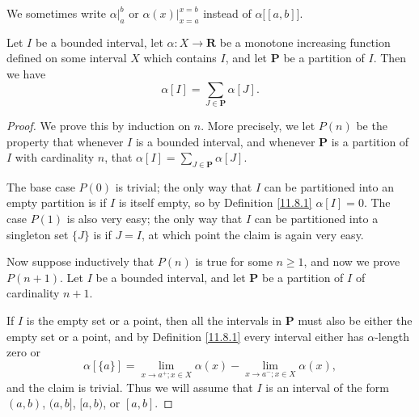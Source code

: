 \begin{note}
    We sometimes write \(\alpha\big|_a^b\) or \(\alpha(x)\big|_{x = a}^{x = b}\) instead of \(\alpha\big[[a, b]\big]\).
\end{note}

\setcounter{theorem}{3}
\begin{lemma}\label{11.8.4}
    Let \(I\) be a bounded interval, let \(\alpha : X \to \mathbf{R}\) be a monotone increasing function defined on some interval \(X\) which contains \(I\), and let \(\mathbf{P}\) be a partition of \(I\).
    Then we have
    \[
        \alpha[I] = \sum_{J \in \mathbf{P}} \alpha[J].
    \]
\end{lemma}

\begin{proof}
    We prove this by induction on \(n\).
    More precisely, we let \(P(n)\) be the property that whenever \(I\) is a bounded interval, and whenever \(\mathbf{P}\) is a partition of \(I\) with cardinality \(n\), that \(\alpha[I] = \sum_{J \in \mathbf{P}} \alpha[J]\).

    The base case \(P(0)\) is trivial;
    the only way that \(I\) can be partitioned into an empty partition is if \(I\) is itself empty, so by Definition \ref{11.8.1} \(\alpha[I] = 0\).
    The case \(P(1)\) is also very easy;
    the only way that \(I\) can be partitioned into a singleton set \(\{J\}\) is if \(J = I\), at which point the claim is again very easy.

    Now suppose inductively that \(P(n)\) is true for some \(n \geq 1\), and now we prove \(P(n + 1)\).
    Let \(I\) be a bounded interval, and let \(\mathbf{P}\) be a partition of \(I\) of cardinality \(n + 1\).

    If \(I\) is the empty set or a point, then all the intervals in \(\mathbf{P}\) must also be either the empty set or a point, and by Definition \ref{11.8.1} every interval either has \(\alpha\)-length zero or
    \[
        \alpha[\{a\}] = \lim_{x \to a^+ ; x \in X} \alpha(x) - \lim_{x \to a^- ; x \in X} \alpha(x),
    \]
    and the claim is trivial.
    Thus we will assume that \(I\) is an interval of the form \((a, b)\), \((a, b]\), \([a, b)\), or \([a, b]\).


\end{proof}
